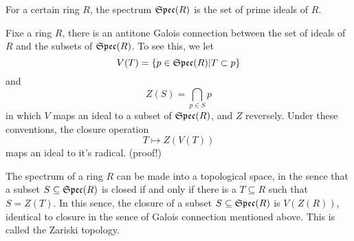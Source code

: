 \begin{def}
    For a certain ring $R$, the spectrum $\mathfrak{Spec}(R)$ is the set of prime ideals of $R$.
\end{def}
\par Fixe a ring $R$, there is an antitone Galois connection between the set of ideals of $R$ and the subsets of $\mathfrak{Spec}(R)$. To see this, we let
\[ V(T) = \{p\in\mathfrak{Spec}(R)|T\subset p\} \]
and
\[ Z(S) = \bigcap_{p\in S}p \]
in which $V$ maps an ideal to a subset of $\mathfrak{Spec}(R)$, and $Z$ reversely. Under these conventions, the closure operation
\[ T\mapsto Z(V(T)) \] maps an ideal to it's radical. (proof!)
\par The spectrum of a ring $R$ can be made into a topological space, in the sence that a subset $S\subseteq\mathfrak{Spec}(R)$ is closed if and only if there is a $T\subseteq R$ such that $S=Z(T)$. In this sence, the closure of a subset $S\subseteq\mathfrak{Spec}(R)$ is $V(Z(R))$, identical to closure in the sence of Galois connection mentioned above. This is called the Zariski topology.







